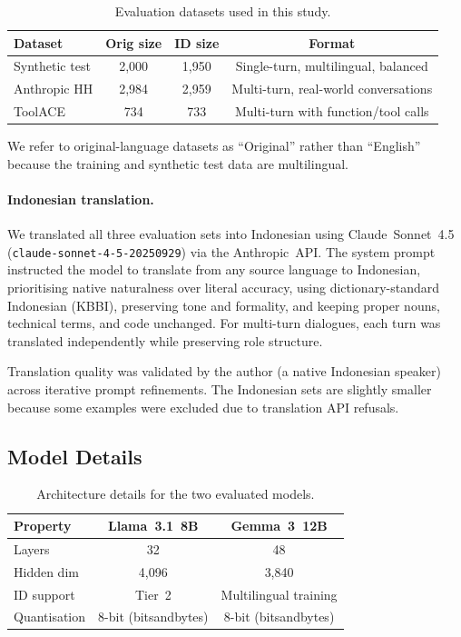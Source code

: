 \documentclass{article}
\newcommand{\llama}{Llama~3.1~8B\xspace}
\newcommand{\gemma}{Gemma~3~12B\xspace}
\begin{document}
\begin{table}[t]
\centering
\caption{Evaluation datasets used in this study.}
\label{tab:datasets}
\begin{tabular}{lccc}
\toprule
Dataset       & Orig size & ID size & Format \\
\midrule
Synthetic test  & 2,000 & 1,950 & Single-turn, multilingual, balanced \\
Anthropic HH  & 2,984 & 2,959 & Multi-turn, real-world conversations \\
ToolACE       & 734   & 733   & Multi-turn with function/tool calls \\
\bottomrule
\end{tabular}
\end{table}

We refer to original-language datasets as ``Original'' rather than ``English''
because the training and synthetic test data are multilingual.

\paragraph{Indonesian translation.}
We translated all three evaluation sets into Indonesian using
Claude~Sonnet~4.5 (\texttt{claude-sonnet-4-5-20250929}) via the Anthropic~API.
The system prompt instructed the model to translate from any source language to
Indonesian, prioritising native naturalness over literal accuracy, using
dictionary-standard Indonesian (KBBI), preserving tone and formality, and keeping
proper nouns, technical terms, and code unchanged.
For multi-turn dialogues, each turn was translated independently while preserving
role structure.

Translation quality was validated by the author (a native Indonesian speaker)
across iterative prompt refinements.
The Indonesian sets are slightly smaller because some examples were excluded
due to translation API refusals.

\subsection{Model Details}

\begin{table}[t]
\centering
\caption{Architecture details for the two evaluated models.}
\label{tab:models}
\begin{tabular}{lcc}
\toprule
Property       & \llama & \gemma \\
\midrule
Layers         & 32     & 48     \\
Hidden dim     & 4,096  & 3,840  \\
ID support     & Tier~2 & Multilingual training \\
Quantisation   & 8-bit (bitsandbytes) & 8-bit (bitsandbytes) \\
\bottomrule
\end{tabular}
\end{table}
\end{document}
